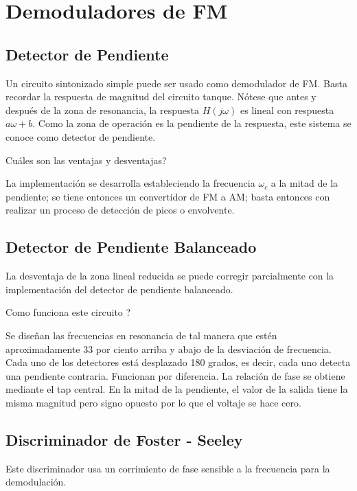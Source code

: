 \documentclass[12pt,letterpaper,titlepage,twoside]{book}
\begin{document}
\section{Demoduladores de FM}
\subsection{Detector de Pendiente}

Un circuito sintonizado simple puede ser usado como demodulador de FM. Basta recordar la respuesta de magnitud del circuito tanque. Nótese que antes  y después de la zona de resonancia, la respuesta $H(j\omega)$ es lineal con respuesta $a\omega+b$. Como la zona de operación es la pendiente de la respuesta, este sistema se conoce como detector de pendiente.

Cuáles son las ventajas y desventajas? 

La implementación se desarrolla estableciendo la frecuencia $\omega_c$ a la mitad de la pendiente; se tiene entonces un convertidor de FM a AM; basta entonces con realizar un proceso de detección de picos o envolvente.

\subsection{Detector de Pendiente Balanceado}
La desventaja de la zona lineal reducida se puede corregir parcialmente con la implementación del detector de pendiente balanceado.

Como funciona este circuito ?

Se diseñan las frecuencias en resonancia de tal manera que estén aproximadamente 33 por ciento arriba y abajo de la desviación de frecuencia. Cada uno de los detectores está desplazado 180 grados, es decir, cada uno detecta una pendiente contraria. Funcionan por diferencia. La relación de fase se obtiene mediante el tap central. En la mitad de la pendiente, el valor de la salida tiene la misma magnitud pero signo opuesto por lo que el voltaje se hace cero. 



\subsection{Discriminador de Foster - Seeley}
Este discriminador usa un corrimiento de fase sensible a la frecuencia para la demodulación.
%
\end{document}
